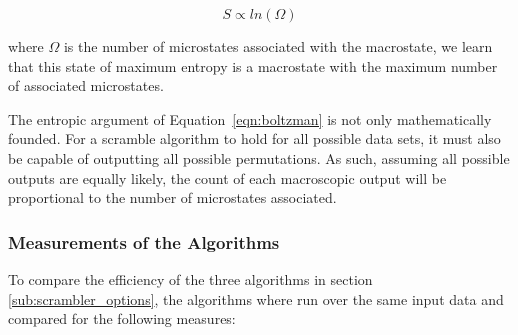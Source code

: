 		\begin{equation}
			S \propto ln(\Omega)
			\label{eqn:boltzman}
		\end{equation}

		where $\Omega$ is the number of microstates associated with the macrostate, we learn that this state of maximum entropy is a macrostate with the maximum number of associated microstates.
		\par
		The entropic argument of Equation~\ref{eqn:boltzman} is not only mathematically founded. 
		For a scramble algorithm to hold for all possible data sets, it must also be capable of outputting all possible permutations. 
		As such, assuming all possible outputs are equally likely, the count of each macroscopic output will be proportional to the number of microstates associated.

		\subsubsection{Measurements of the Algorithms} 
		\label{subsub:messurements_of_the_algorithms}

			To compare the efficiency of the three algorithms in section \ref{sub:scrambler_options}, the algorithms where run over the same input data and compared for the following measures:

